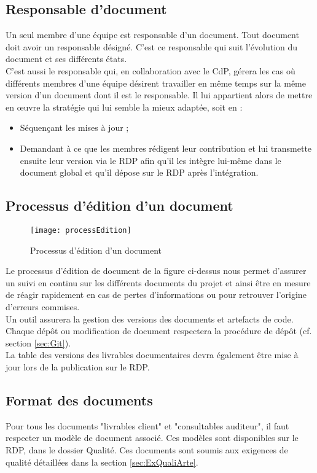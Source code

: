 \documentclass[a4paper,11pt,titlepage]{article}
\begin{document}
\subsection{Responsable d'document}
Un seul membre d'une équipe est responsable d'un document.
Tout document doit avoir un responsable désigné. C'est ce responsable qui
suit l'évolution du document et ses différents états.\\

C'est aussi le responsable qui, en collaboration avec le CdP, gérera les cas où différents membres d'une équipe désirent travailler en même temps sur la
même version d'un document dont il est le responsable.
Il lui appartient alors de mettre en œuvre la stratégie
qui lui semble la mieux adaptée, soit en :
\begin{itemize}
    \item Séquençant les mises à jour ;
    \item Demandant à ce que les membres rédigent leur contribution et lui transmette ensuite leur version via le RDP
          afin qu'il les intègre lui-même dans le document global et qu'il dépose sur le RDP après l'intégration.
\end{itemize}

\subsection{Processus d'édition d'un document}
\begin{figure}[H]
    \centering
    \texttt{[image: processEdition]}
    \caption{Processus d'édition d'un document}
\end{figure}

Le processus d'édition de document de la figure ci-dessus nous permet d'assurer un suivi en
continu sur les différents documents du projet et ainsi être
en mesure de réagir rapidement en cas de pertes d'informations
ou pour retrouver l'origine d'erreurs commises. \\

Un outil assurera la gestion des versions des documents et artefacts de code.
Chaque dépôt ou modification de document respectera la procédure de dépôt
(cf. section \ref{sec:Git}). \\

La table des versions des livrables documentaires devra également être mise à
jour lors de la publication sur le RDP. \\

\subsection{Format des documents}
Pour tous les documents "livrables client" et "consultables auditeur",
il faut respecter un modèle de document associé. Ces modèles
sont disponibles sur le RDP, dans le dossier Qualité. Ces documents sont soumis aux exigences de qualité
détaillées dans la section \ref{sec:ExQualiArte}.
\end{document}
